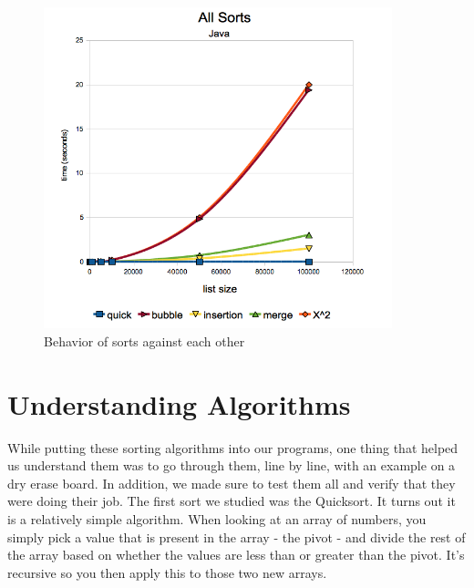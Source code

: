 \documentclass[12pt]{amsart}
\begin{document}
\begin{figure}[H]
  \centering
    \includegraphics[width=0.9\textwidth]{JAllSorts.png}
  \caption{Behavior of sorts against each other}
\end{figure}


\section*{Understanding Algorithms}

While putting these sorting algorithms into our programs, one thing that helped
us understand them was to go through them, line by line, with an example on a
dry erase board. In addition, we made sure to test them all and verify that they
were doing their job. The first sort we studied was the Quicksort. It turns out
it is a relatively simple algorithm. When looking at an array of numbers, you
simply pick a value that is present in the array - the pivot - and divide the 
rest of the array based on whether the values are less than or greater than the 
pivot. It's recursive so you then apply this to those two new arrays.
\end{document}
